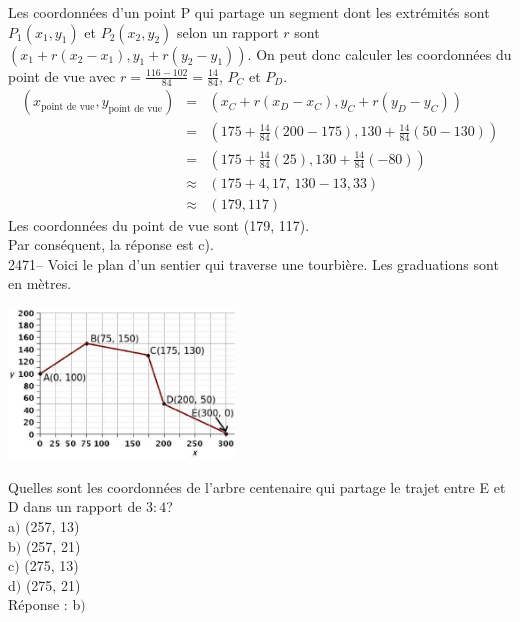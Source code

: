\documentclass[letterpaper, 12pt]{article}
\begin{document}
Les coordonn\'ees d'un point P qui partage un segment dont les extr\'emit\'es sont $P_{1}(x_{1}, y_{1})$ et $P_{2}(x_{2}, y_{2})$ selon un rapport $r$ sont $\left( x_{1}+r(x_{2}-x_{1}), y_{1}+r(y_{2}-y_{1})\right) $. On peut donc calculer les coordonn\'ees du point de vue avec $r=\frac{116-102}{84}=\frac{14}{84}$, $P_{C}$ et $P_{D}$.
\begin{eqnarray*}
(x_{\textrm{point de vue}}, y_{\textrm{point de vue}})&=& \left( x_{C}+r(x_{D}-x_{C}), y_{C}+r(y_{D}-y_{C})\right)\\
&=& \left( 175+\frac{14}{84}(200-175), 130+\frac{14}{84}(50-130)\right)\\
&=& \left( 175+\frac{14}{84}(25), 130+\frac{14}{84}(-80)\right)\\
&\approx& \left( 175+4,17,\, 130-13,33\right)\\
&\approx& \left( 179, 117\right)
\end{eqnarray*}
Les coordonn\'ees du point de vue sont (179, 117).\\
Par cons\'equent, la r\'eponse est c).\\

2471-- Voici le plan d'un sentier qui traverse une tourbi\`ere. Les graduations sont en m\`etres. \\
\begin{center}
 \includegraphics[width=6cm,bb=14 14 531 362]{Q2468.eps}
\end{center}
Quelles sont les coordonn\'ees de l'arbre centenaire qui partage le trajet entre E et D dans un rapport de $3:4$?\\

a$)$ (257, 13)\\
b$)$ (257, 21)\\
c$)$ (275, 13)\\
d$)$ (275, 21)\\

R\'eponse : b$)$\\
\end{document}
